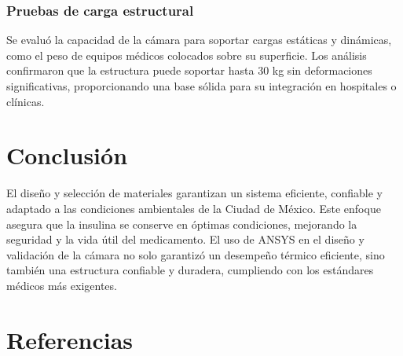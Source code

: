 \documentclass{article}
\begin{document}
\begin{multicols}{2}
\subsubsection*{Pruebas de carga estructural}
Se evaluó la capacidad de la cámara para soportar cargas estáticas y dinámicas, como el peso de equipos médicos colocados sobre su superficie. Los análisis confirmaron que la estructura puede soportar hasta 30 kg sin deformaciones significativas, proporcionando una base sólida para su integración en hospitales o clínicas.

	
	\section{Conclusión}
	El diseño y selección de materiales garantizan un sistema eficiente, confiable y adaptado a las condiciones ambientales de la Ciudad de México. Este enfoque asegura que la insulina se conserve en óptimas condiciones, mejorando la seguridad y la vida útil del medicamento. El uso de ANSYS en el diseño y validación de la cámara no solo garantizó un desempeño térmico eficiente, sino también una estructura confiable y duradera, cumpliendo con los estándares médicos más exigentes.
	
	
	\section*{Referencias}
	

\end{multicols}
\end{document}
